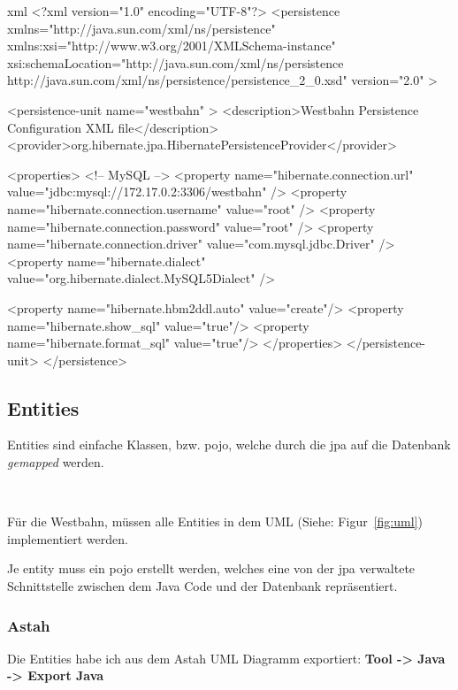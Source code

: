 \begin{code}{xml}
<?xml version="1.0" encoding="UTF-8"?>
<persistence xmlns="http://java.sun.com/xml/ns/persistence"
                xmlns:xsi="http://www.w3.org/2001/XMLSchema-instance"
                xsi:schemaLocation="http://java.sun.com/xml/ns/persistence http://java.sun.com/xml/ns/persistence/persistence_2_0.xsd"
                version="2.0" >

    <persistence-unit name="westbahn" >
        <description>Westbahn Persistence Configuration XML file</description>
        <provider>org.hibernate.jpa.HibernatePersistenceProvider</provider>

        <properties>
            <!-- MySQL -->
            <property name="hibernate.connection.url" value="jdbc:mysql://172.17.0.2:3306/westbahn" />
            <property name="hibernate.connection.username" value="root" />
            <property name="hibernate.connection.password" value="root" />
            <property name="hibernate.connection.driver" value="com.mysql.jdbc.Driver" />
            <property name="hibernate.dialect" value="org.hibernate.dialect.MySQL5Dialect" />

            <property name="hibernate.hbm2ddl.auto" value="create"/>
            <property name="hibernate.show_sql" value="true"/>
            <property name="hibernate.format_sql" value="true"/>
        </properties>
    </persistence-unit>
</persistence>
\end{code}

\clearpage
\subsection{Entities}

Entities sind einfache Klassen, bzw. \gls{pojo}, welche durch die \gls{jpa} auf die Datenbank \textit{gemapped} \cite{wiki:mapping} werden.

\

Für die Westbahn, müssen alle Entities in dem UML (Siehe: Figur~\ref{fig:uml}) implementiert werden.

Je \gls{entity} muss ein \gls{pojo} erstellt werden, welches eine von der \gls{jpa} verwaltete Schnittstelle zwischen dem Java Code und der Datenbank repräsentiert.

\subsubsection{Astah}

Die Entities habe ich aus dem Astah UML Diagramm exportiert: \textbf{Tool -> Java -> Export Java}

